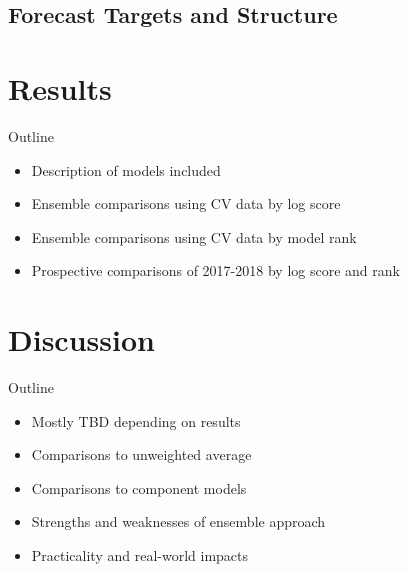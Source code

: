 \documentclass{article}
\begin{document}
\subsection{Forecast Targets and Structure}




\section{Results}

Outline
\begin{itemize}
    \item Description of models included
    \item Ensemble comparisons using CV data by log score
    \item Ensemble comparisons using CV data by model rank
    \item Prospective comparisons of 2017-2018 by log score and rank
\end{itemize}






\section{Discussion}

Outline
\begin{itemize}
  \item Mostly TBD depending on results
  \item Comparisons to unweighted average
  \item Comparisons to component models
  \item Strengths and weaknesses of ensemble approach
  \item Practicality and real-world impacts
\end{itemize}




\end{document}
